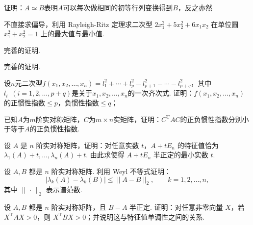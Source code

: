 \begin{exercise}
    \begin{exgroup}
        \item 证明：$A\simeq B$表明$A$可以每次做相同的初等行列变换得到$B$，反之亦然

        \item 不直接求偏导，利用 Rayleigh-Ritz 定理求二次型 $2x_1^2+5x_2^2+6x_1x_2$ 在单位圆 $x_1^2+x_2^2=1$ 上的最大值与最小值.

        \item 完善的证明.

        \item 完善的证明.
    \end{exgroup}

    \begin{exgroup}
        \item 设$n$元二次型$f(x_1,x_2,\ldots,x_n)=l_1^2+\cdots+l_p^2-l_{p+1}^2-\cdots-l_{p+q}^2$，其中$l_i\enspace (i=1,2,\ldots,p+q)$是关于$x_1,x_2,\ldots,x_n$的一次齐次式. 证明：$f(x_1,x_2,\ldots,x_n)$的正惯性指数$\leqslant p$，负惯性指数$\leqslant q$；

        \item 已知$A$为$m$阶实对称矩阵，$C$为$m\times n$实矩阵，证明：$C^\mathrm{T}AC$的正负惯性指数分别小于等于$A$的正负惯性指数.

        \item 设 $A$ 是 $n$ 阶实对称矩阵，证明：对任意实数 $t$，$A+tE_n$ 的特征值恰为 $\lambda_1(A)+t,\ldots,\lambda_n(A)+t$. 由此求使得 $A+tE_n$ 半正定的最小实数 $t$.

        \item 设 $A,B$ 都是 $n$ 阶实对称矩阵. 利用 Weyl 不等式证明：
        \[
            |\lambda_k(A)-\lambda_k(B)|\leqslant \|A-B\|_2, \qquad k=1,2,\ldots,n,
        \]
        其中 $\|\,\cdot\,\|_2$ 表示谱范数.

        \item 设 $A,B$ 都是 $n$ 阶实对称矩阵，且 $B-A$ 半正定. 证明：对任意非零向量 $X$，若 $X^\mathrm{T}AX>0$，则 $X^\mathrm{T}BX>0$；并说明这与特征值单调性之间的关系.
    \end{exgroup}
\end{exercise}
